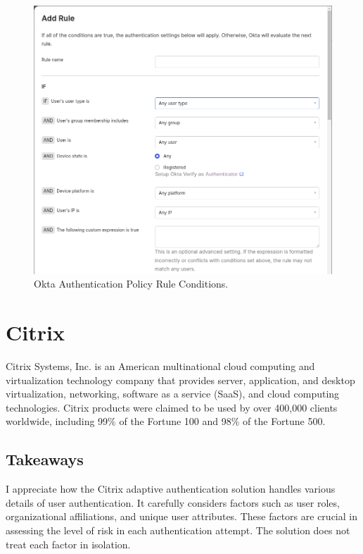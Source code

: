 \begin{figure}[htbp]
  \centering
  \includegraphics[width=1\textwidth]{img/okta-add-rule.png}
  \caption{Okta Authentication Policy Rule Conditions.}
  \label{fig:okta-auth-policy-rule-condition}
\end{figure}

\newpage
\section{Citrix}

Citrix Systems, Inc. is an American multinational cloud computing and virtualization technology company that provides server, application, and desktop virtualization, networking, software as a service (SaaS), and cloud computing technologies.
Citrix products were claimed to be used by over 400,000 clients worldwide, including 99\% of the Fortune 100 and 98\% of the Fortune 500.

\subsection*{Takeaways}
I appreciate how the Citrix adaptive authentication solution handles various details of user authentication.
It carefully considers factors such as user roles, organizational affiliations, and unique user attributes.
These factors are crucial in assessing the level of risk in each authentication attempt.
The solution does not treat each factor in isolation.\cite{existing-citrix-wiki} \cite{existing-citrix-blog}

